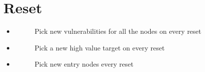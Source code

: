 \documentclass[letterpaper,10pt,english]{sphinxmanual}
\begin{document}
\section{Reset}
\label{\detokenize{source/config_file:reset}}\begin{itemize}
\item {} \begin{description}
\item[{}] \leavevmode
\sphinxAtStartPar
Pick new vulnerabilities for all the nodes on every reset

\end{description}

\item {} \begin{description}
\item[{}] \leavevmode
\sphinxAtStartPar
Pick a new high value target on every reset

\end{description}

\item {} \begin{description}
\item[{}] \leavevmode
\sphinxAtStartPar
Pick new entry nodes every reset

\end{description}

\end{itemize}
\end{document}
